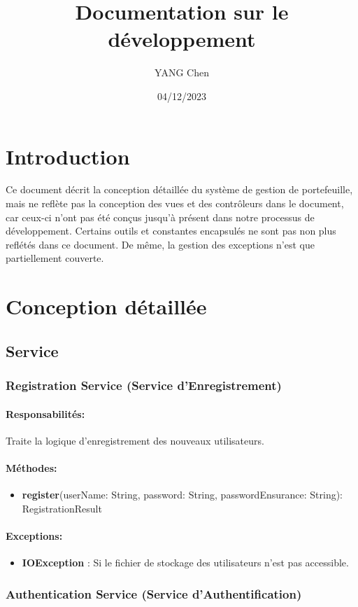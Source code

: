 \documentclass{article}
\title{Documentation sur le développement}
\date{04/12/2023}
\author{YANG Chen}
\begin{document}
\maketitle
\tableofcontents
\newpage
\section{Introduction}
Ce document décrit la conception détaillée du système de gestion de portefeuille, mais ne reflète pas la conception des vues et des contrôleurs dans le document, car ceux-ci n'ont pas été conçus jusqu'à présent dans notre processus de développement. Certains outils et constantes encapsulés ne sont pas non plus reflétés dans ce document. De même, la gestion des exceptions n'est que partiellement couverte.
\section{Conception détaillée}
\subsection{Service}
\subsubsection{Registration Service (Service d'Enregistrement)}
\paragraph{Responsabilités:} Traite la logique d'enregistrement des nouveaux utilisateurs.
\paragraph{Méthodes:}
\begin{itemize}
  \item \textbf{register}(userName: String, password: String, passwordEnsurance: String): RegistrationResult
\end{itemize}
\paragraph{Exceptions:}
\begin{itemize}
  \item \textbf{IOException} : Si le fichier de stockage des utilisateurs n'est pas accessible. 
\end{itemize}
\subsubsection{Authentication Service (Service d'Authentification)}
\end{document}
